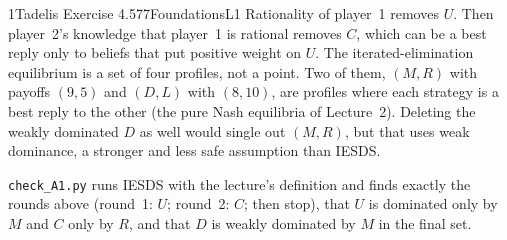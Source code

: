 \begin{exsol}{1}{Tadelis Exercise 4.5}{77}{Foundations}{L1}
\interp Rationality of player~1 removes $U$. Then player~2's knowledge that player~1 is rational
removes $C$, which can be a best reply only to beliefs that put positive weight on $U$. The iterated-elimination
equilibrium is a set of four profiles, not a point. Two of them, $(M,R)$ with payoffs $(9,5)$
and $(D,L)$ with $(8,10)$, are profiles where each strategy is a best reply to the other (the
pure Nash equilibria of Lecture~2). Deleting the weakly dominated $D$ as well would single out
$(M,R)$, but that uses weak dominance, a stronger and less safe assumption than IESDS.

\verify \texttt{check\_A1.py} runs IESDS with the lecture's definition and finds exactly the
rounds above (round~1: $U$; round~2: $C$; then stop), that $U$ is dominated only by $M$ and $C$
only by $R$, and that $D$ is weakly dominated by $M$ in the final set.

\end{exsol}
